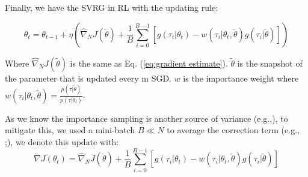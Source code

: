 Finally, we have the SVRG in RL with the updating rule:

\begin{equation}
  \label{eq:svrpg}
  \theta_t = \theta_{t-1} + \eta\left(\widehat{\nabla}_N J(\tilde{\theta}) + \frac{1}{B}\sum_{i=0}^{B-1}\left[g(\tau_i|\theta_t) - w(\tau_i|\theta_t, \tilde{\theta})g(\tau_i|\tilde{\theta}) \right]\right)
\end{equation}

Where $\widehat{\nabla}_N J(\tilde{\theta})$ is the same as Eq. (\ref{eq:gradient estimate}). $\tilde{\theta}$ is the snapshot of the parameter that is updated every m SGD. $w$ is the importance weight where $w(\tau_i|\theta_t, \tilde{\theta})=\frac{p(\tau|\tilde{\theta})}{p(\tau|\theta_t)}$.

As we know the importance sampling is another source of variance (e.g.,\cite{thomas2015high}), to mitigate this, we used a mini-batch $B \ll N$ to average the correction term (e.g., \cite{babanezhad2015stopwasting};\cite{avdiukhin2021federated}), we denote this update with:
$$\widetilde{\nabla} J(\theta_t)=\widehat{\nabla}_N J(\tilde{\theta}) + \frac{1}{B}\sum_{i=0}^{B-1}\left[g(\tau_i|\theta_t) - w(\tau_i|\theta_t, \tilde{\theta})g(\tau_i|\tilde{\theta}) \right]$$
